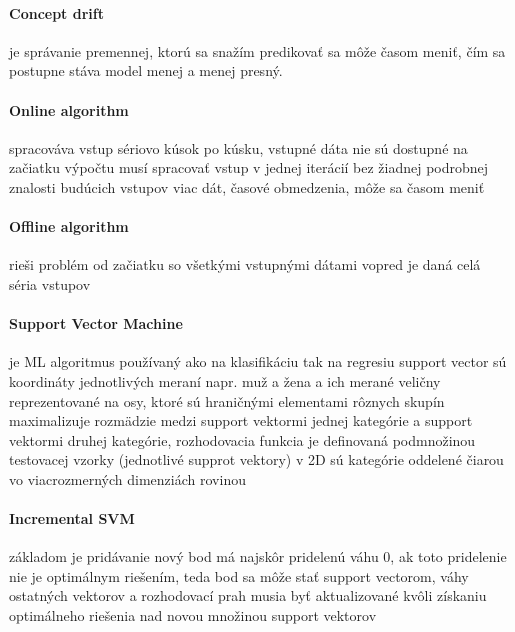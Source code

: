 \documentclass[12pt,oneside,slovak,a4paper]{book}
\begin{document}
\paragraph{Concept drift}
je správanie premennej, ktorú sa snažím predikovať sa môže časom meniť,
čím sa postupne stáva model menej a menej presný\cite{Grmanova2016}.

\paragraph{Online algorithm}
spracováva vstup sériovo kúsok po kúsku, vstupné dáta nie sú dostupné na začiatku výpočtu %
musí spracovať vstup v jednej iterácií bez žiadnej podrobnej znalosti budúcich vstupov %
viac dát, časové obmedzenia, môže sa časom meniť %

\paragraph{Offline algorithm}
rieši problém od začiatku so všetkými vstupnými dátami %
vopred je daná celá séria vstupov %

\paragraph{Support Vector Machine}
je ML algoritmus používaný ako na klasifikáciu tak na regresiu
support vector sú koordináty jednotlivých meraní napr. muž a žena a ich merané veličny reprezentované na osy, ktoré sú hraničnými elementami rôznych skupín
maximalizuje rozmädzie medzi support vektormi jednej kategórie a support vektormi druhej kategórie, rozhodovacia funkcia je definovaná podmnožinou testovacej vzorky (jednotlivé supprot vektory)
v 2D sú kategórie oddelené čiarou vo viacrozmerných dimenziách rovinou

\paragraph{Incremental SVM}
základom je pridávanie %
nový bod má najskôr pridelenú váhu 0, ak toto pridelenie nie je optimálnym riešením, teda bod sa môže stať support vectorom,
váhy ostatných vektorov a rozhodovací prah musia byť aktualizované kvôli získaniu optimálneho riešenia nad novou množinou support vektorov
\end{document}
